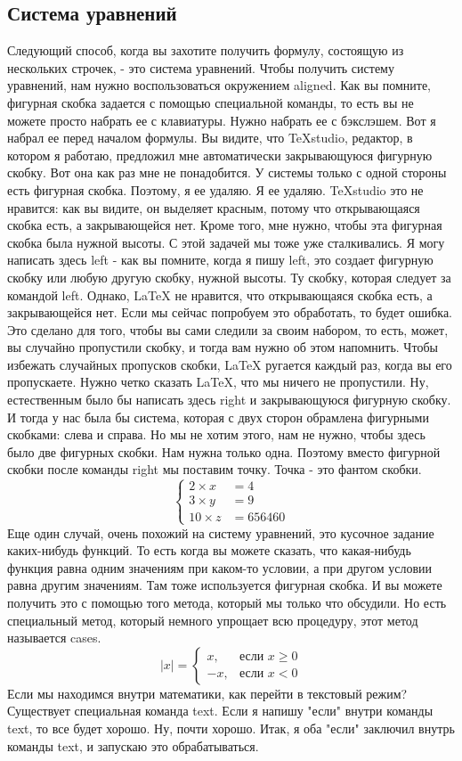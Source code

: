 \documentclass[a4paper,12pt]{article} %
\begin{document}
{\subsection{Система уравнений}
Следующий способ, когда вы
захотите получить формулу, состоящую из нескольких строчек, - это
система уравнений.
Чтобы получить систему уравнений, нам
нужно воспользоваться окружением aligned. Как вы помните, фигурная скобка
задается с помощью специальной команды, то есть вы не можете просто
набрать ее с клавиатуры. Нужно набрать ее с бэкслэшем. Вот я набрал ее перед началом формулы. Вы видите, что TeXstudio, редактор, в
котором я работаю, предложил мне автоматически
закрывающуюся фигурную скобку. Вот она как раз мне не понадобится. У системы только с одной стороны есть
фигурная скобка. Поэтому, я ее удаляю. Я ее удаляю. TeXstudio это не нравится: как вы
видите, он выделяет красным, потому что открывающаяся скобка
есть, а закрывающейся нет. Кроме того, мне нужно, чтобы эта фигурная
скобка была нужной высоты. С этой задачей мы тоже уже сталкивались. Я могу написать здесь left - как вы
помните, когда я пишу left, это создает фигурную скобку или
любую другую скобку, нужной высоты. Ту скобку, которая следует за командой
left. Однако, LaTeX не нравится, что открывающаяся скобка есть, а
закрывающейся нет. Если мы сейчас попробуем это обработать,
то будет ошибка. Это сделано для того, чтобы вы сами
следили за своим набором, то есть, может, вы случайно пропустили скобку,
и тогда вам нужно об этом напомнить. Чтобы избежать случайных пропусков скобки,
LaTeX ругается каждый раз, когда вы его
пропускаете. Нужно четко сказать LaTeX, что мы ничего не пропустили. Ну,
естественным было бы написать здесь right и
закрывающуюся фигурную скобку. И тогда у нас была бы система, которая с двух сторон обрамлена фигурными
скобками: слева и справа. Но мы не хотим этого, нам не нужно, чтобы здесь было две
фигурных скобки. Нам нужна только одна. Поэтому вместо фигурной скобки после
команды right мы поставим точку. Точка - это фантом скобки.
\[
\left\{
\begin{aligned}
2\times x&=4 \\
3\times y&=9 \\
10\times z &= 656460 	
\end{aligned}
\right.
\]
Еще один случай, очень похожий на систему уравнений, это кусочное задание
каких-нибудь функций. То есть когда вы можете сказать, что
какая-нибудь функция равна одним значениям при каком-то условии, а при
другом условии равна другим значениям. Там тоже используется фигурная скобка. И вы можете получить это с помощью того метода, который мы только что
обсудили. Но есть специальный метод, который немного упрощает всю процедуру, этот метод
называется cases.
\[
|x| = \begin{cases}
x, &\text{если } x \ge 0 \\
-x, &\text{если } x < 0
\end{cases}
\]
 Если мы находимся внутри математики, как
 перейти в текстовый режим? Существует специальная команда text. Если
 я напишу "если" внутри команды text, то все будет
 хорошо. Ну, почти хорошо. Итак, я оба "если" заключил внутрь команды
 text, и запускаю это обрабатываться.
 
}
\end{document}
